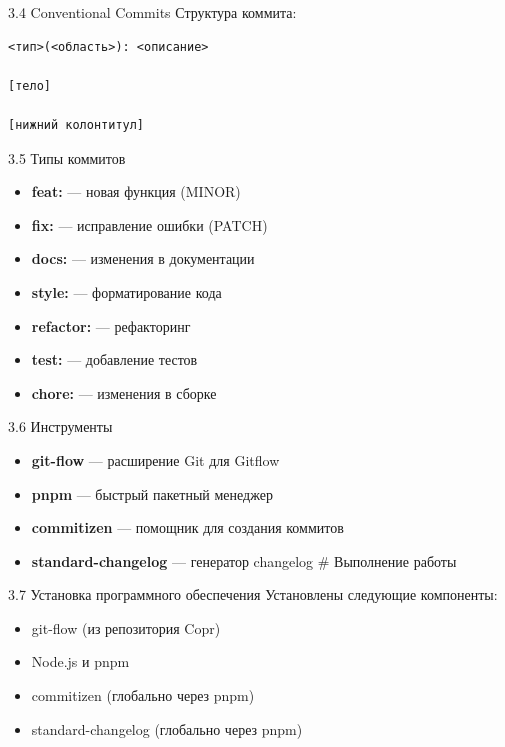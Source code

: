 \documentclass[
  ignorenonframetext,
  aspectratio=169,
  russian,
]{beamer}
\providecommand{\tightlist}{%
  \setlength{\itemsep}{0pt}\setlength{\parskip}{0pt}}
\begin{document}
\begin{frame}[fragile]{3.4 Conventional Commits}
\label{conventional-commits}
Структура коммита:

\begin{verbatim}
<тип>(<область>): <описание>

[тело]

[нижний колонтитул]
\end{verbatim}
\end{frame}

\begin{frame}{3.5 Типы коммитов}
\label{ux442ux438ux43fux44b-ux43aux43eux43cux43cux438ux442ux43eux432}
\begin{itemize}[<+->]
\tightlist
\item
  \textbf{feat:} --- новая функция (MINOR)
\item
  \textbf{fix:} --- исправление ошибки (PATCH)
\item
  \textbf{docs:} --- изменения в документации
\item
  \textbf{style:} --- форматирование кода
\item
  \textbf{refactor:} --- рефакторинг
\item
  \textbf{test:} --- добавление тестов
\item
  \textbf{chore:} --- изменения в сборке
\end{itemize}
\end{frame}

\begin{frame}{3.6 Инструменты}
\label{ux438ux43dux441ux442ux440ux443ux43cux435ux43dux442ux44b}
\begin{itemize}[<+->]
\tightlist
\item
  \textbf{git-flow} --- расширение Git для Gitflow
\item
  \textbf{pnpm} --- быстрый пакетный менеджер
\item
  \textbf{commitizen} --- помощник для создания коммитов
\item
  \textbf{standard-changelog} --- генератор changelog \# Выполнение
  работы
\end{itemize}
\end{frame}

\begin{frame}{3.7 Установка программного обеспечения}
\label{ux443ux441ux442ux430ux43dux43eux432ux43aux430-ux43fux440ux43eux433ux440ux430ux43cux43cux43dux43eux433ux43e-ux43eux431ux435ux441ux43fux435ux447ux435ux43dux438ux44f}
Установлены следующие компоненты:

\begin{itemize}[<+->]
\tightlist
\item
  git-flow (из репозитория Copr)
\item
  Node.js и pnpm
\item
  commitizen (глобально через pnpm)
\item
  standard-changelog (глобально через pnpm)
\end{itemize}
\end{frame}
\end{document}
